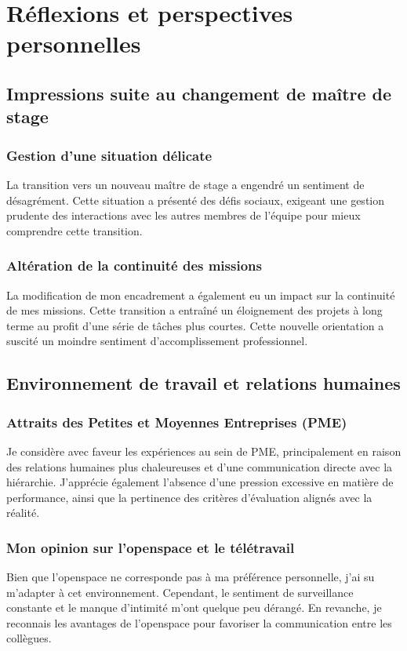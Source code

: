 \section{Réflexions et perspectives personnelles}
\subsection{Impressions suite au changement de maître de stage}
\subsubsection{Gestion d'une situation délicate}
La transition vers un nouveau maître de stage a engendré un sentiment de désagrément.
Cette situation a présenté des défis sociaux, exigeant une gestion prudente des interactions avec les autres membres de l'équipe pour mieux comprendre cette transition.


\subsubsection{Altération de la continuité des missions}
La modification de mon encadrement a également eu un impact sur la continuité de mes missions.
Cette transition a entraîné un éloignement des projets à long terme au profit d'une série de tâches plus courtes.
Cette nouvelle orientation a suscité un moindre sentiment d'accomplissement professionnel.


\subsection{Environnement de travail et relations humaines}
\subsubsection{Attraits des Petites et Moyennes Entreprises (PME)}
Je considère avec faveur les expériences au sein de PME, principalement en raison des relations humaines plus chaleureuses et d'une communication directe avec la hiérarchie.
J'apprécie également l'absence d'une pression excessive en matière de performance, ainsi que la pertinence des critères d'évaluation alignés avec la réalité.


\subsubsection{Mon opinion sur l'openspace et le télétravail}
Bien que l'openspace ne corresponde pas à ma préférence personnelle, j'ai su m'adapter à cet environnement.
Cependant, le sentiment de surveillance constante et le manque d'intimité m'ont quelque peu dérangé.
En revanche, je reconnais les avantages de l'openspace pour favoriser la communication entre les collègues.

